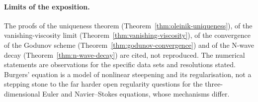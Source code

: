 \paragraph{Limits of the exposition.}
The proofs of the uniqueness theorem (Theorem~\ref{thm:oleinik-uniqueness}),
of the vanishing-viscosity limit (Theorem~\ref{thm:vanishing-viscosity}), of
the convergence of the Godunov scheme (Theorem~\ref{thm:godunov-convergence})
and of the N-wave decay (Theorem~\ref{thm:n-wave-decay}) are cited, not
reproduced. The numerical statements are observations for the specific data
sets and resolutions stated. Burgers' equation is a model of nonlinear
steepening and its regularisation, not a stepping stone to the far harder
open regularity questions for the three-dimensional Euler and Navier--Stokes
equations, whose mechanisms differ.